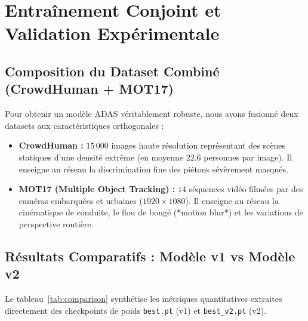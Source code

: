 \documentclass[11pt,a4paper]{article}
\begin{document}
\section{Entraînement Conjoint et Validation Expérimentale}

\subsection{Composition du Dataset Combiné (CrowdHuman + MOT17)}
Pour obtenir un modèle ADAS véritablement robuste, nous avons fusionné deux datasets aux caractéristiques orthogonales :
\begin{itemize}
    \item \textbf{CrowdHuman :} $15\,000$ images haute résolution représentant des scènes statiques d'une densité extrême (en moyenne $22.6$ personnes par image). Il enseigne au réseau la discrimination fine des piétons sévèrement masqués.
    \item \textbf{MOT17 (Multiple Object Tracking) :} $14$ séquences vidéo filmées par des caméras embarquées et urbaines ($1920\times 1080$). Il enseigne au réseau la cinématique de conduite, le flou de bougé (*motion blur*) et les variations de perspective routière.
\end{itemize}

\subsection{Résultats Comparatifs : Modèle v1 vs Modèle v2}
Le tableau~\ref{tab:comparison} synthétise les métriques quantitatives extraites directement des checkpoints de poids \texttt{best.pt} (v1) et \texttt{best\_v2.pt} (v2).
\end{document}
